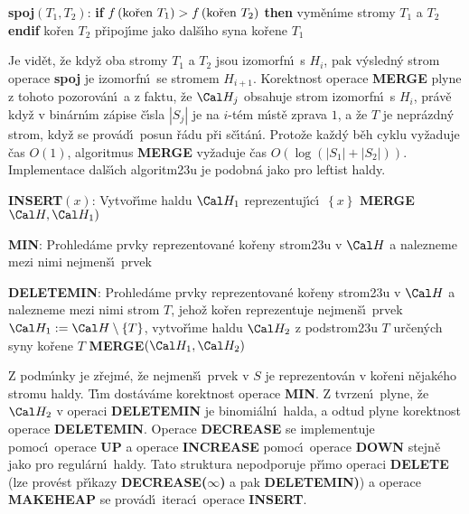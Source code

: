 {\bf spoj$\left(T_1,T_2\right)$}:\newline 
{\bf if} $f\left(\text{\rm ko\v ren }T_1\right)>f\left(\text{\rm ko\v ren }T_2\right)$ {\bf then}\newline 
\phantom{---}vym\v en\'\i me stromy $T_1$ a $T_2$\newline 
{\bf endif}\newline 
ko\v ren $T_2$ p\v ripoj\'\i me jako dal\v s\'\i ho syna ko\v rene $
T_1$
\medskip

\flushpar Je vid\v et, \v ze kdy\v z oba stromy $T_1$ a $T_2$ jsou 
izomorfn\'\i\ s $H_i$, pak v\'ysledn\'y strom operace {\bf spoj} je 
izomorfn\'\i\ se stromem $H_{i+1}$. Korektnost ope\-race {\bf MERGE} plyne z tohoto pozorov\'an\'\i\ a z faktu, \v ze $\Cal H_j$ obsahuje strom 
izomorfn\'\i\ s $H_i$, pr\'av\v e kdy\v z v bin\'arn\'\i m z\'apise 
\v c\'\i sla $|S_j|$ je na $i$-t\'em 
m\'\i st\v e zprava $1$, a \v ze $T$ je nepr\'azdn\'y strom, kdy\v z se 
prov\'ad\'\i\ posun \v r\'adu p\v ri s\v c\'\i t\'an\'\i . Proto\v ze ka\v zd\'y b\v eh 
cyklu vy\v zaduje \v cas $O\left(1\right)$, algoritmus {\bf MER\-GE} vy\v zaduje \v cas 
$O\left(\log\left(|S_1|+|S_2|\right)\right)$. Implementace dal\v s\'\i ch algoritm\accent23u 
je podobn\'a jako pro leftist haldy. 
\bigskip

{\bf INSERT$\left(x\right)$}:\newline 
Vytvo\v r\'\i me haldu $\Cal H_1$ reprezentuj\'\i c\'\i\ $\left\{x\right\}$\newline 
{\bf MERGE}$\Cal H,\Cal H_1)$
\bigskip

{\bf MIN}:\newline 
Prohled\'ame prvky reprezentovan\'e ko\v reny strom\accent23u 
v $\Cal H$ a nalez\-ne\-me mezi nimi nejmen\v s\'\i\ prvek
\bigskip

{\bf DELETEMIN}:\newline 
Prohled\'ame prvky reprezentovan\'e ko\v reny strom\accent23u 
v $\Cal H$ a nalez\-neme mezi nimi strom $T$, jeho\v z ko\v ren reprezentuje 
nejmen\v s\'\i\ prvek\newline
$\Cal H_1:=\Cal H\setminus \left\{T\right\}$, vytvo\v r\'\i me haldu $
\Cal H_2$ z podstrom\accent23u $T$ ur\v cen\'ych syny ko\v rene $T$\newline 
{\bf MERGE$\left(\Cal H_1,\Cal H_2\right)$}
\bigskip

\flushpar Z podm\'\i nky  je z\v rejm\'e, \v ze 
nejmen\v s\'\i\ prvek v $S$ je reprezentov\'an v ko\v reni n\v ejak\'eho  
stromu haldy. T\'\i m dost\'av\'ame korekt\-nost ope\-race {\bf MIN}.
Z tvrzen\'\i\ plyne, \v ze $\Cal H_2$ v ope\-raci {\bf DELE\-TE\-MIN} je 
binomi\'aln\'\i\ halda, a odtud plyne korekt\-nost ope\-race 
{\bf DE\-LE\-TEMIN}. Operace {\bf DECREASE} se implementuje pomoc\'\i\ 
ope\-race {\bf UP} a ope\-race {\bf INCREASE} pomoc\'\i\ 
ope\-race {\bf DOWN} stejn\v e jako pro regul\'arn\'\i\ haldy. Tato 
struktura nepodporuje p\v r\'\i mo operaci {\bf DELETE} (lze prov\'est p\v r\'\i kazy {\bf DECREASE($\infty$)} a pak {\bf DELETEMIN)}) a ope\-race 
{\bf MAKEHEAP} se prov\'ad\'\i\ iterac\'\i\ operace {\bf INSERT}.
\medskip

